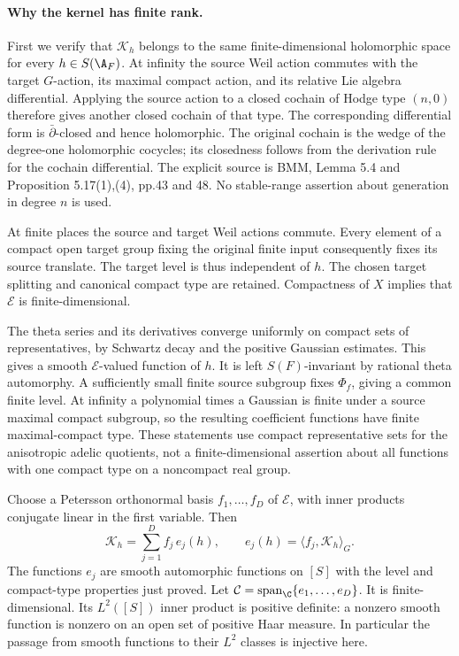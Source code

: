 \paragraph{Why the kernel has finite rank.}
First we verify that $\mathcal K_h$ belongs to the same
finite-dimensional holomorphic space for every $h\in S(\A_F)$.
At infinity the source Weil action commutes with the target
$G$-action, its maximal compact action, and its relative Lie
algebra differential. Applying the source action to a closed
cochain of Hodge type $(n,0)$ therefore gives another closed
cochain of that type. The corresponding differential form is
$\bar\partial$-closed and hence holomorphic. The original cochain
is the wedge of the degree-one holomorphic cocycles; its
closedness follows from the derivation rule for the cochain
differential. The explicit source is BMM, Lemma 5.4 and
Proposition 5.17(1),(4), pp.43 and 48. No stable-range assertion
about generation in degree $n$ is used.

At finite places the source and target Weil actions commute.
Every element of a compact open target group fixing the original
finite input consequently fixes its source translate. The target
level is thus independent of $h$. The chosen target splitting
and canonical compact type are retained. Compactness of $X$
implies that $\mathcal E$ is finite-dimensional.

The theta series and its derivatives converge uniformly on compact
sets of representatives, by Schwartz decay and the positive
Gaussian estimates. This gives a smooth $\mathcal E$-valued
function of $h$. It is left $S(F)$-invariant by rational theta
automorphy. A sufficiently small finite source subgroup fixes
$\Phi_f$, giving a common finite level. At infinity a polynomial
times a Gaussian is finite under a source maximal compact
subgroup, so the resulting coefficient functions have finite
maximal-compact type. These statements use compact representative
sets for the anisotropic adelic quotients, not a finite-dimensional
assertion about all functions with one compact type on a
noncompact real group.

Choose a Petersson orthonormal basis
$f_1,\ldots,f_D$ of $\mathcal E$, with inner products conjugate
linear in the first variable. Then
\begin{equation}\label{A7-kernel}
 \mathcal K_h=\sum_{j=1}^D f_j\,e_j(h),
 \qquad e_j(h)=\langle f_j,\mathcal K_h\rangle_G .
\end{equation}
The functions $e_j$ are smooth automorphic functions on $[S]$
with the level and compact-type properties just proved.
Let $\mathcal C=\operatorname{span}_{\C}\{e_1,\ldots,e_D\}$.
It is finite-dimensional. Its $L^2([S])$ inner product is positive
definite: a nonzero smooth function is nonzero on an open set
of positive Haar measure. In particular the passage from smooth
functions to their $L^2$ classes is injective here.

